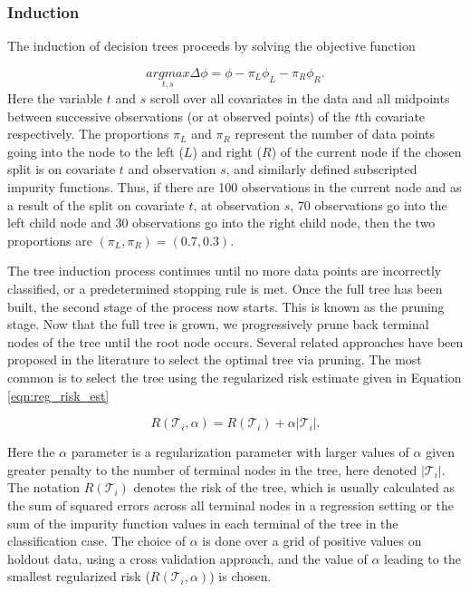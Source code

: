 \subsubsection{Induction}
The induction of decision trees proceeds by solving the objective function

\begin{equation}
\underset{t,s}{argmax} \Delta\phi = \phi - \pi_L\phi_L-\pi_R\phi_R.
\end{equation}
Here the variable $t$ and $s$ scroll over all covariates in the data and all midpoints between successive observations (or at observed points) of the $t$th covariate respectively. The proportions $\pi_L$ and $\pi_R$ represent the number of data points going into the node to the left ($L$) and right ($R$) of the current node if the chosen split is on covariate $t$ and observation $s$, and similarly defined subscripted impurity functions. Thus, if there are 100 observations in the current node and as a result of the split on covariate $t$, at observation $s$, 70 observations go into the left child node and 30 observations go into the right child node, then the two proportions are $(\pi_L, \pi_R) = (0.7, 0.3)$. 

The tree induction process continues until no more data points are incorrectly classified, or a predetermined stopping rule is met. Once the full tree has been built, the second stage of the process now starts. This is known as the pruning stage. Now that the full tree is grown, we progressively prune back terminal nodes of the tree until the root node occurs. Several related approaches have been proposed in the literature to select the optimal tree via pruning. The most common is to select the tree using the regularized risk estimate given in Equation \ref{eqn:reg_risk_est} 

\begin{equation}\label{eqn:reg_risk_est}
R(\mathcal{T}_i,\alpha) = R(\mathcal{T}_i) + \alpha \vert \mathcal{T}_i \vert. 
\end{equation}

Here the $\alpha$ parameter is a regularization parameter with larger values of $\alpha$ given greater penalty to the number of terminal nodes in the tree, here denoted $\vert \mathcal{T}_i\vert$. The notation $R(\mathcal{T}_i)$ denotes the risk of the tree, which is usually calculated as the sum of squared errors across all terminal nodes in a regression setting or the sum of the impurity function values in each terminal of the tree in the classification case. The choice of $\alpha$ is done over a grid of positive values on holdout data, using a cross validation approach, and the value of $\alpha$ leading to the smallest regularized risk ($R(\mathcal{T}_i,\alpha)$) is chosen.  

